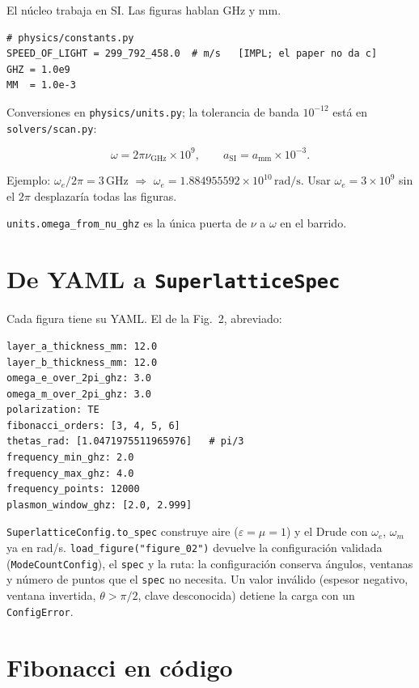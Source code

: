 \documentclass[11pt,a4paper]{article}
\begin{document}
El núcleo trabaja en SI. Las figuras hablan GHz y mm.

\begin{lstlisting}[style=tiny]
# physics/constants.py
SPEED_OF_LIGHT = 299_792_458.0  # m/s   [IMPL; el paper no da c]
GHZ = 1.0e9
MM  = 1.0e-3
\end{lstlisting}

Conversiones en \texttt{physics/units.py}; la tolerancia de banda
\(10^{-12}\) está en \texttt{solvers/scan.py}:

\begin{equation}
\omega=2\pi\nu_{\mathrm{GHz}}\times 10^9,\qquad
a_{\mathrm{SI}}=a_{\mathrm{mm}}\times 10^{-3}.
\end{equation}

Ejemplo: \(\omega_e/2\pi=3\,\mathrm{GHz}\) \(\Rightarrow\)
\(\omega_e=1.884955592\times 10^{10}\,\mathrm{rad/s}\).
Usar \(\omega_e=3\times 10^9\) sin el \(2\pi\) desplazaría todas las figuras.

\texttt{units.omega\_from\_nu\_ghz} es la única puerta de \(\nu\) a
\(\omega\) en el barrido.

\section{De YAML a \texttt{SuperlatticeSpec}}

Cada figura tiene su YAML. El de la Fig.~2, abreviado:

\begin{lstlisting}[style=tiny]
layer_a_thickness_mm: 12.0
layer_b_thickness_mm: 12.0
omega_e_over_2pi_ghz: 3.0
omega_m_over_2pi_ghz: 3.0
polarization: TE
fibonacci_orders: [3, 4, 5, 6]
thetas_rad: [1.0471975511965976]   # pi/3
frequency_min_ghz: 2.0
frequency_max_ghz: 4.0
frequency_points: 12000
plasmon_window_ghz: [2.0, 2.999]
\end{lstlisting}

\texttt{SuperlatticeConfig.to\_spec} construye aire (\(\varepsilon=\mu=1\)) y el Drude
con \(\omega_e\), \(\omega_m\) ya en rad/s.
\texttt{load\_figure("figure\_02")} devuelve la configuración validada
(\texttt{ModeCountConfig}), el \texttt{spec} y la ruta: la configuración
conserva ángulos, ventanas y número de puntos que el \texttt{spec} no necesita.
Un valor inválido (espesor negativo, ventana invertida, \(\theta>\pi/2\),
clave desconocida) detiene la carga con un \texttt{ConfigError}.

\section{Fibonacci en código}
\end{document}
